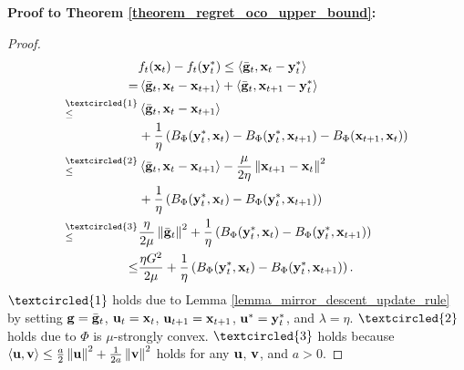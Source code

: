 \documentclass[journal]{IEEEtran}
\begin{document}
\textbf{Proof to Theorem \ref{theorem_regret_oco_upper_bound}:} 
\begin{proof}


\begin{align}
\nonumber
& f_t(\x_t) -f_t(\y_t^\ast)  \le \lrangle{\bar{\g}_t, \x_t - \y_t^\ast } \\ \nonumber
= & \lrangle{\bar{\g}_t, \x_t - \x_{t+1}} + \lrangle{\bar{\g}_t, \x_{t+1} - \y_t^\ast } \\ \nonumber
\refabovecir{\le}{\textcircled{1}} & \lrangle{\bar{\g}_t, \x_t - \x_{t+1}} \\ \nonumber
& + \frac{1}{\eta}\lrincir{ B_{\Phi}(\y_t^\ast, \x_t) -  B_{\Phi}(\y_t^\ast, \x_{t+1}) - B_{\Phi}(\x_{t+1}, \x_t) } \\ \nonumber
\refabovecir{\le}{\textcircled{2}} & \lrangle{\bar{\g}_t, \x_t - \x_{t+1}}  - \frac{\mu}{2\eta} \lrnorm{\x_{t+1} - \x_t}^2 \\ \nonumber
& + \frac{1}{\eta}\lrincir{ B_{\Phi}(\y_t^\ast, \x_t) -  B_{\Phi}(\y_t^\ast, \x_{t+1}) } \\ \nonumber
\refabovecir{\le}{\textcircled{3}} & \frac{\eta}{2\mu}\lrnorm{\bar{\g}_t}^2 + \frac{1}{\eta}\lrincir{ B_{\Phi}(\y_t^\ast, \x_t) -  B_{\Phi}(\y_t^\ast, \x_{t+1}) } \\ \nonumber
\le & \frac{\eta G^2}{2\mu} + \frac{1}{\eta}\lrincir{ B_{\Phi}(\y_t^\ast, \x_t) -  B_{\Phi}(\y_t^\ast, \x_{t+1}) }.
\end{align} $\textcircled{1}$ holds due to Lemma \ref{lemma_mirror_descent_update_rule} by setting ${\bf g} = \bar{{\bf g}}_t$, ${\bf u}_t = {\bf x}_t$, ${\bf u}_{t+1} = {\bf x}_{t+1}$, ${\bf u}^\ast = {\bf y}_t^\ast$, and $\lambda = \eta$. $\textcircled{2}$ holds due to $\Phi$ is $\mu$-strongly convex.  $\textcircled{3}$  holds because $\left\langle{\bf u},{\bf v} \right\rangle \le \frac{a}{2} \left\lVert{\bf u}\right\rVert^2 + \frac{1}{2a}\left\lVert{\bf v}\right\rVert^2$ holds for any ${\bf u}$, ${\bf v}$, and $a>0$.


\end{proof}
\end{document}
